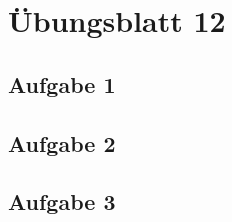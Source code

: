 \documentclass[aspectratio=169,usepdftitle=true,11pt,ngerman,t]{beamer}
\subtitle{Tutorium 12}
\date{17. Januar 2025}
\begin{document}
\section[Ein letztes Mal...]{Übungsblatt 12}

\subsection{Aufgabe 1}


\subsection{Aufgabe 2}


\subsection{Aufgabe 3}

\end{document}
